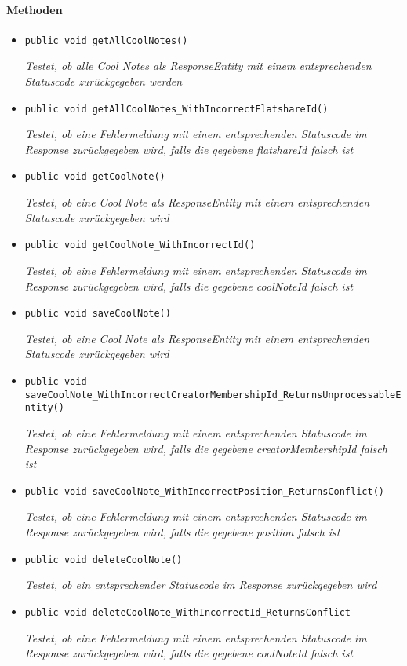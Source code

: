  \paragraph*{Methoden}
 \begin{itemize}
 	\item{\texttt{public void getAllCoolNotes()}}
 	
 	\textit{Testet, ob alle Cool Notes als ResponseEntity mit einem entsprechenden Statuscode zurückgegeben werden}
 	
 	\item{\texttt{public void getAllCoolNotes\_WithIncorrectFlatshareId()}}
 	
 	\textit{Testet, ob eine Fehlermeldung mit einem entsprechenden Statuscode im Response zurückgegeben wird, falls die gegebene flatshareId falsch ist}
 	
 	\item{\texttt{public void getCoolNote()}}
 	
 	\textit{Testet, ob eine Cool Note als ResponseEntity mit einem entsprechenden Statuscode zurückgegeben wird}
 	
 	\item{\texttt{public void getCoolNote\_WithIncorrectId()}}
 	
 	\textit{Testet, ob eine Fehlermeldung mit einem entsprechenden Statuscode im Response zurückgegeben wird, falls die gegebene coolNoteId falsch ist}
 	
 	\item{\texttt{public void saveCoolNote()}}
 	
 	\textit{Testet, ob eine Cool Note als ResponseEntity mit einem entsprechenden Statuscode zurückgegeben wird}
 	
 	\item{\texttt{public void saveCoolNote\_WithIncorrectCreatorMembershipId\_Returns\-UnprocessableEntity()}}
 	
 	\textit{Testet, ob eine Fehlermeldung mit einem entsprechenden Statuscode im Response zurückgegeben wird, falls die gegebene creatorMembershipId falsch ist}
 	
 	\item{\texttt{public void saveCoolNote\_WithIncorrectPosition\_ReturnsConflict()}}
 	
 	\textit{Testet, ob eine Fehlermeldung mit einem entsprechenden Statuscode im Response zurückgegeben wird, falls die gegebene position falsch ist}
 	
 	\item{\texttt{public void deleteCoolNote()}}
 	
 	\textit{Testet, ob ein entsprechender Statuscode im Response zurückgegeben wird}
 	
 	\item{\texttt{public void deleteCoolNote\_WithIncorrectId\_ReturnsConflict}}
 	
 	\textit{Testet, ob eine Fehlermeldung mit einem entsprechenden Statuscode im Response zurückgegeben wird, falls die gegebene coolNoteId falsch ist}
 \end{itemize}
 
